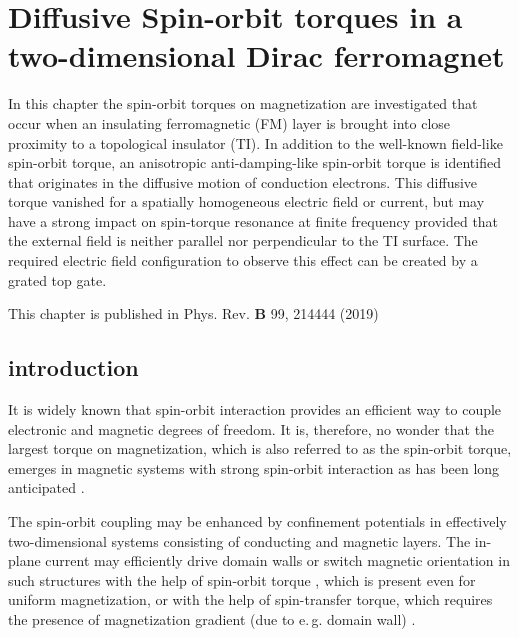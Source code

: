 \chapter{Diffusive Spin-orbit torques in a two-dimensional Dirac ferromagnet}
In this chapter the spin-orbit torques on magnetization are investigated that occur when an insulating ferromagnetic (FM) layer is brought into close proximity to a topological insulator (TI). In addition to the well-known field-like spin-orbit torque, an anisotropic anti-damping-like spin-orbit torque is identified that originates in the diffusive motion of conduction electrons. This diffusive torque vanished for a spatially homogeneous electric field or current, but may have a strong impact on spin-torque resonance at finite frequency provided that the external field is neither parallel nor perpendicular to the TI surface. The required electric field configuration to observe this effect can be created by a grated top gate.

\vfill
This chapter is published in Phys. Rev. \textbf{B} 99, 214444 (2019) 
\clearpage

\section{introduction}
It is widely known that spin-orbit interaction provides an efficient way to couple electronic and magnetic degrees of freedom. It is, therefore, no wonder that the largest torque on magnetization, which is also referred to as the spin-orbit torque, emerges in magnetic systems with strong spin-orbit interaction \cite{miron_current-driven_2010,haney_current_2013} as has been long anticipated \cite{dyakonov_current-induced_1971}. 

The spin-orbit coupling may be enhanced by confinement potentials in effectively two-dimensional systems consisting of conducting and magnetic layers. The in-plane current may efficiently drive domain walls or switch magnetic orientation in such structures with the help of spin-orbit torque \cite{awschalom2009trend,manchon_theory_2008,garate_influence_2009,manchon2009theory}, which is present even for uniform magnetization, or with the help of spin-transfer torque, which requires the presence of magnetization gradient (due to e.\,g. domain wall) \cite{slonczewski_current-driven_1996,berger_emission_1996,ralph_spin_2008,stiles_anatomy_2002}. 

